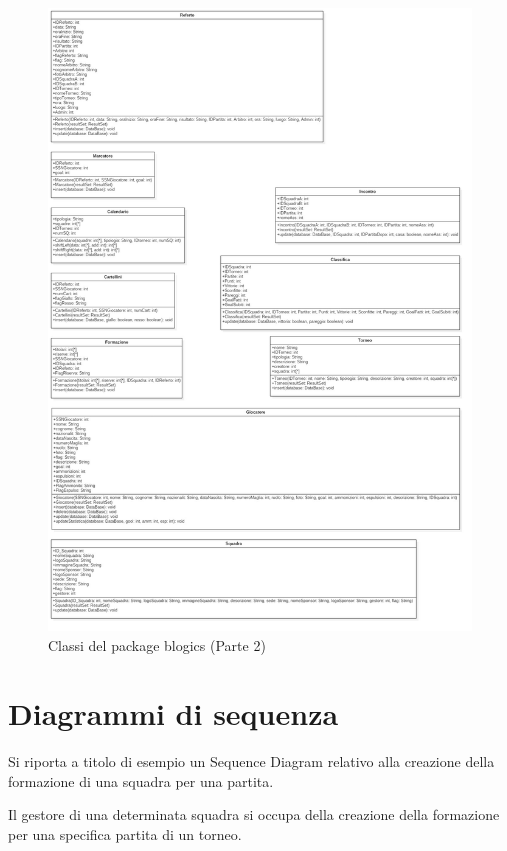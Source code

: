 	\begin{figure}[h]
		\centering
		\includegraphics[width=1\textwidth]
		{immagini/c-blogics-p2}
		
		\caption{Classi del package blogics (Parte 2)}
		\label{c-blogics-p2}
	\end{figure}

\clearpage

\section{Diagrammi di sequenza}
Si riporta a titolo di esempio un Sequence Diagram relativo alla creazione della formazione di una squadra per una partita.

Il gestore di una determinata squadra si occupa della creazione della formazione per una specifica partita di un torneo.

